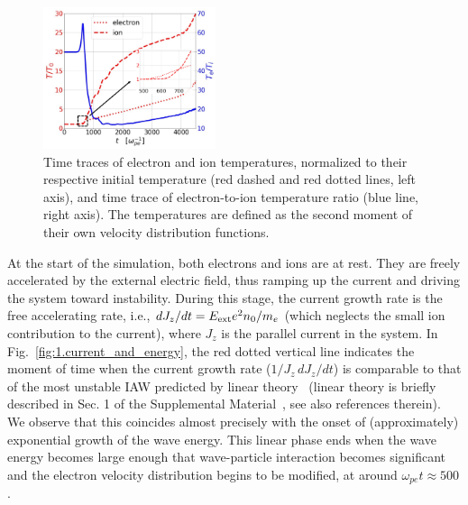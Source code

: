 \documentclass[%
 reprint,
 amsmath,
 amssymb,
 aps,
 prx,
floatfix,
superscriptaddress
]{revtex4-2}
\begin{document}
\begin{figure}[!htbp]
\includegraphics[width=0.45\textwidth]{Fig3.pdf}%
\caption{\label{fig:3.temp} Time traces of electron and ion temperatures, normalized to their respective initial temperature (red dashed and red dotted lines, left axis), and time trace of electron-to-ion temperature ratio (blue line, right axis). The temperatures are defined as the second moment of their own velocity distribution functions.}
\end{figure}

At the start of the simulation, both electrons and ions are at rest.
They are freely accelerated by the external electric field, thus ramping up the current and driving the system toward instability. 
During this stage, the current growth rate is the free accelerating rate, i.e.,  $dJ_z/dt = E_{\rm{ext}} e^2 n_0 / m_e$ (which neglects the small ion contribution to the current), where $J_z$ is the parallel current in the system.
In Fig.~\ref{fig:1.current_and_energy}, the red dotted vertical line indicates the moment of time when the current growth rate ($1/J_z\, dJ_z/dt$) is comparable to that of the most unstable IAW predicted by linear theory~\cite{jackson1960drift} (linear theory is briefly described in Sec. 1 of the Supplemental Material~\cite{SM}, see also references \cite{schekochihin2022lectures} therein). 
We observe that this coincides almost precisely with the onset of (approximately) exponential growth of the wave energy.
This linear phase ends when the wave energy becomes large enough that wave-particle interaction becomes significant and the electron velocity distribution begins to be modified, at around $\omega_{pe}t \approx 500$.
\end{document}
